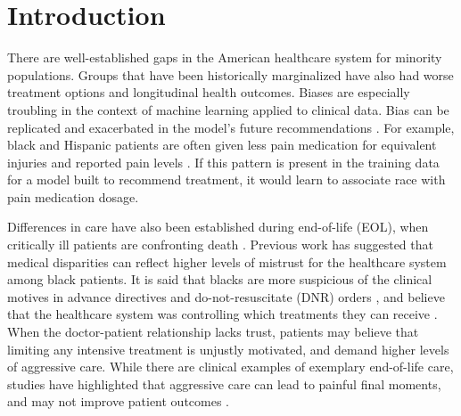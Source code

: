 \documentclass{article}
\begin{document}
\section{Introduction}

There are well-established gaps in the American healthcare system for minority populations.
Groups that have been historically marginalized have also had worse treatment options and longitudinal health outcomes. 
Biases are especially troubling in the context of machine learning applied to clinical data. Bias can be replicated and exacerbated in the model's future recommendations \citep{ensign2017runaway}. For example, black and Hispanic patients are often given less pain medication for equivalent injuries and reported pain levels \citep{jama:pain-meds-kids,plos:pain-meds}. If this pattern is present in the training data for a model built to recommend treatment, it would learn to associate race with pain medication dosage. 


Differences in care have also been established during end-of-life (EOL), when critically ill patients are confronting death \citep{muni:race-ses-eol-icu,lee:dying-icu}. Previous work has suggested that medical disparities can reflect higher levels of mistrust for the healthcare system among black patients. It is said that blacks are more suspicious of the clinical motives in advance directives and do-not-resuscitate (DNR) orders \citep{wunsch2010three}, and believe that the healthcare system was controlling which treatments they can receive \citep{perkins2002cross}. When the doctor-patient relationship lacks trust, patients may believe that limiting any intensive treatment is unjustly motivated, and demand higher levels of aggressive care. While there are clinical examples of exemplary end-of-life care, studies have highlighted that aggressive care can lead to painful final moments, and may not improve patient outcomes \citep{cipolletta2014good}.


\end{document}

